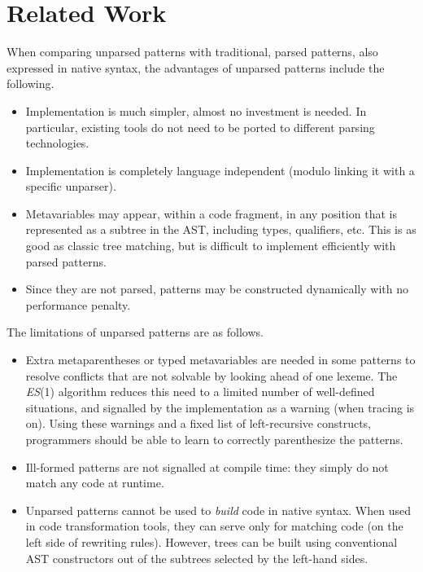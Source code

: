 
\section{Related Work}
\label{related_work}

When comparing unparsed patterns with traditional, parsed patterns,
also expressed in native syntax, the advantages of unparsed patterns
include the following.
\begin{itemize}

  \item Implementation is much simpler, almost no investment is
    needed. In particular, existing tools do not need to be ported to
    different parsing technologies.

  \item Implementation is completely language independent (modulo
    linking it with a specific unparser).

  \item Meta\-variables may appear, within a code fragment, in any
    position that is represented as a subtree in the AST, including
    types, qualifiers, etc. This is as good as classic tree matching,
    but is difficult to implement efficiently with parsed patterns.

  \item Since they are not parsed, patterns may be constructed
    dynamically with no performance penalty.

\end{itemize}
The limitations of unparsed patterns are as follows.
\begin{itemize}

  \item Extra meta\-parentheses or typed meta\-variables are needed in
    some patterns to resolve conflicts that are not solvable by
    looking ahead of one lexeme. The \textit{ES}(1) algorithm reduces
    this need to a limited number of well\hyp{}defined situations, and
    signalled by the implementation as a warning (when tracing is
    on). Using these warnings and a fixed list of left\hyp{}recursive
    constructs, programmers should be able to learn to correctly
    parenthesize the patterns.

  \item Ill\hyp{}formed patterns are not signalled at compile time:
    they simply do not match any code at runtime.

  \item Unparsed patterns cannot be used to \emph{build} code in
    native syntax. When used in code transformation tools, they can
    serve only for matching code (on the left side of rewriting
    rules). However, trees can be built using conventional AST
    constructors out of the subtrees selected by the left\hyp{}hand
    sides. 

\end{itemize}
